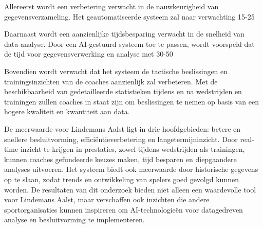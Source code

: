 Allereerst wordt een verbetering verwacht in de nauwkeurigheid van gegevensverzameling. Het geautomatiseerde systeem zal naar verwachting 15-25%

Daarnaast wordt een aanzienlijke tijdsbesparing verwacht in de snelheid van data-analyse. Door een AI-gestuurd systeem toe te passen, wordt voorspeld dat de tijd voor gegevensverwerking en analyse met 30-50%

Bovendien wordt verwacht dat het systeem de tactische beslissingen en trainingsinzichten van de coaches aanzienlijk zal verbeteren. Met de beschikbaarheid van gedetailleerde statistieken tijdens en na wedstrijden en trainingen zullen coaches in staat zijn om beslissingen te nemen op basis van een hogere kwaliteit en kwantiteit aan data. 

De meerwaarde voor Lindemans Aalst ligt in drie hoofdgebieden: betere en snellere besluitvorming, efficiëntieverbetering en langetermijninzicht. Door real-time inzicht te krijgen in prestaties, zowel tijdens wedstrijden als trainingen, kunnen coaches gefundeerde keuzes maken, tijd besparen en diepgaandere analyses uitvoeren. Het systeem biedt ook meerwaarde door historische gegevens op te slaan, zodat trends en ontwikkeling van spelers goed gevolgd kunnen worden. De resultaten van dit onderzoek bieden niet alleen een waardevolle tool voor Lindemans Aalst, maar verschaffen ook inzichten die andere sportorganisaties kunnen inspireren om AI-technologieën voor datagedreven analyse en besluitvorming te implementeren.
